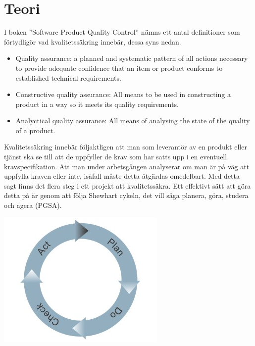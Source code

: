 \section{Teori}
I boken ''Software Product Quality Control'' \cite{SPQC} nämns ett antal definitioner som förtydligör vad kvalitetssäkring innebär, dessa syns nedan.  

\begin{itemize}
  \item Quality assurance: a planned and systematic pattern of all actions necessary to provide adequate confidence that an item or product conforms to established technical requirements. 
  \item Constructive quality assurance: All means to be used in constructing a product in a way so it  meets its quality requirements. 
  \item Analyctical quality assurance: All means of analysing the state of the quality of a product. 
\end{itemize}
\noindent Kvalitetssäkring innebär följaktligen att man som leverantör av en produkt eller tjänst ska se till att de uppfyller de krav som har satts upp i en eventuell kravspecifikation. Att man under arbetsgången analyserar om man är på väg att uppfylla kraven eller inte, isåfall måste detta åtgärdas omedelbart.
\newline
\newline
Med detta sagt finns det flera steg i ett projekt att kvalitetssäkra. Ett effektivt sätt att göra detta på är genom att följa Shewhart cykeln, det vill säga planera, göra, studera och agera (PGSA).
\newline
\centerline{\includegraphics[scale=0.5]{ruben-tex/graphic/shewhartcycle}}


